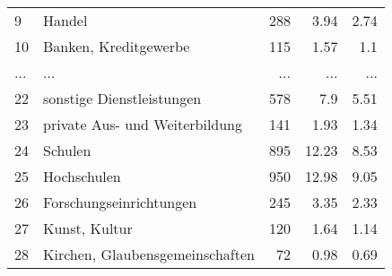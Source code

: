 \begin{longtable}{lXrrr}
        9 & \multicolumn{1}{X}{Handel} & %
          \num{288} &
          \num[round-mode=places,round-precision=2]{3,94} &
          \num[round-mode=places,round-precision=2]{2,74} \\
        10 & \multicolumn{1}{X}{Banken, Kreditgewerbe} & %
          \num{115} &
          \num[round-mode=places,round-precision=2]{1,57} &
          \num[round-mode=places,round-precision=2]{1,1} \\
       ... & ... & ... & ... & ... \\
        22 & \multicolumn{1}{X}{sonstige Dienstleistungen} & %
          \num{578} &
          \num[round-mode=places,round-precision=2]{7,9} &
          \num[round-mode=places,round-precision=2]{5,51} \\

        23 & \multicolumn{1}{X}{private Aus- und Weiterbildung} & %
          \num{141} &
          \num[round-mode=places,round-precision=2]{1,93} &
          \num[round-mode=places,round-precision=2]{1,34} \\

        24 & \multicolumn{1}{X}{Schulen} & %
          \num{895} &
          \num[round-mode=places,round-precision=2]{12,23} &
          \num[round-mode=places,round-precision=2]{8,53} \\

        25 & \multicolumn{1}{X}{Hochschulen} & %
          \num{950} &
          \num[round-mode=places,round-precision=2]{12,98} &
          \num[round-mode=places,round-precision=2]{9,05} \\

        26 & \multicolumn{1}{X}{Forschungseinrichtungen} & %
          \num{245} &
          \num[round-mode=places,round-precision=2]{3,35} &
          \num[round-mode=places,round-precision=2]{2,33} \\

        27 & \multicolumn{1}{X}{Kunst, Kultur} & %
          \num{120} &
          \num[round-mode=places,round-precision=2]{1,64} &
          \num[round-mode=places,round-precision=2]{1,14} \\

        28 & \multicolumn{1}{X}{Kirchen, Glaubensgemeinschaften} & %
          \num{72} &
          \num[round-mode=places,round-precision=2]{0,98} &
          \num[round-mode=places,round-precision=2]{0,69} \\


\end{longtable}
